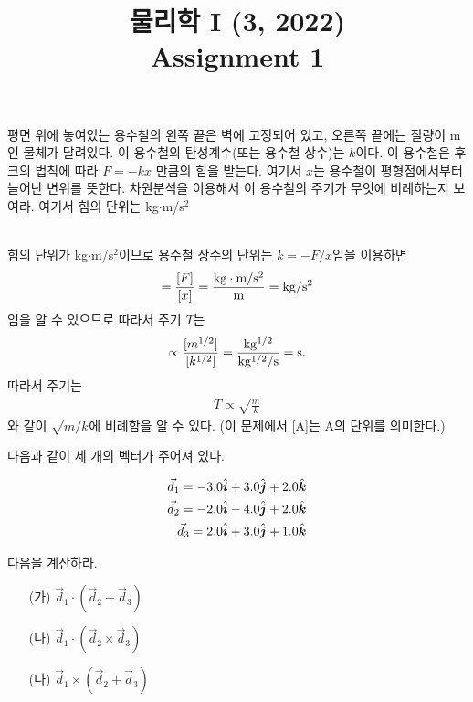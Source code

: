 \documentclass[floatfix,nofootinbib,superscriptaddress,fleqn]{revtex4-2}
\begin{document}
\title{\Large 물리학 I (3, 2022) \\
 Assignment 1}

\maketitle

 평면 위에 놓여있는 용수철의 왼쪽 끝은 벽에 고정되어 있고, 오른쪽 끝에는 질량이 m인 물체가 달려있다. 이 용수철의 탄성계수(또는 용수철 상수)는 $k$이다. 이 용수철은 후크의 법칙에 따라 $F=-kx$ 만큼의 힘을 받는다. 여기서 $x$는 용수철이 평형점에서부터 늘어난 변위를 뜻한다. 차원분석을 이용해서 이 용수철의 주기가 무엇에 비례하는지 보여라. 여기서 힘의 단위는 kg$\cdot$m/s$^2$


\vspace{0.5 cm}

 \\

\noindent 힘의 단위가 kg$\cdot$m/s$^2$이므로 용수철 상수의 단위는 $k=-F/x$임을 이용하면
\begin{align}
[k]  =\frac{[F]}{[x]}=\frac{\rm kg\cdot m/s^2}{\rm m}=\rm kg/s^2
\end{align}
임을 알 수 있으므로 따라서 주기 $T$는
\begin{align}
  [T]\propto \frac{[m^{1/2}]}{[k^{1/2}]}=\frac{\rm kg^{1/2}}{\rm kg^{1/2}/s}=\rm s.
\end{align}
따라서 주기는 
\begin{align}
  T\propto\sqrt{\frac{m}{k}}
\end{align}
와 같이 $\sqrt{m/k}$에 비례함을 알 수 있다.
(이 문제에서 [A]는 A의 단위를 의미한다.)\\

\vspace{0.5 cm}

 다음과 같이 세 개의 벡터가 주어져 있다.

\begin{align}
  \vec{d}_1=-3.0\hat{\boldsymbol{i}}+3.0\hat{\boldsymbol{j}}+2.0\hat{\boldsymbol{k}}\cr
  \vec{d}_2=-2.0\hat{\boldsymbol{i}}-4.0\hat{\boldsymbol{j}}+2.0\hat{\boldsymbol{k}}\cr
  \vec{d}_3=2.0\hat{\boldsymbol{i}}+3.0\hat{\boldsymbol{j}}+1.0\hat{\boldsymbol{k}}\cr
\end{align}

다음을 계산하라.
\begin{itemize}
  \item[(가)] $\vec{d}_1\cdot(\vec{d}_2+\vec{d}_3)$
  \item[(나)] $\vec{d}_1\cdot(\vec{d}_2\times\vec{d}_3)$
  \item[(다)] $\vec{d}_1\times(\vec{d}_2+\vec{d}_3)$
\end{itemize}
\vspace{0.5 cm}
\end{document}
